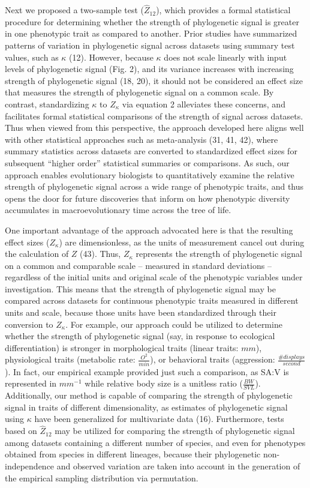 \documentclass[9pt,twocolumn,twoside,lineno]{pnas-new}
\begin{document}
Next we proposed a two-sample test (\(\hat{Z}_{12}\)), which provides a
formal statistical procedure for determining whether the strength of
phylogenetic signal is greater in one phenotypic trait as compared to
another. Prior studies have summarized patterns of variation in
phylogenetic signal across datasets using summary test values, such as
\(\kappa\) (12). However, because \(\kappa\) does not scale linearly
with input levels of phylogenetic signal (Fig. 2), and its variance
increases with increasing strength of phylogenetic signal (18, 20), it
should not be considered an effect size that measures the strength of
phylogenetic signal on a common scale. By contrast, standardizing
\(\kappa\) to \(Z_\kappa\) via equation 2 alleviates these concerns, and
facilitates formal statistical comparisons of the strength of signal
across datasets. Thus when viewed from this perspective, the approach
developed here aligns well with other statistical approaches such as
meta-analysis (31, 41, 42), where summary statistics across datasets are
converted to standardized effect sizes for subsequent ``higher order''
statistical summaries or comparisons. As such, our approach enables
evolutionary biologists to quantitatively examine the relative strength
of phylogenetic signal across a wide range of phenotypic traits, and
thus opens the door for future discoveries that inform on how phenotypic
diversity accumulates in macroevolutionary time across the tree of life.

One important advantage of the approach advocated here is that the
resulting effect sizes (\(Z_\kappa\)) are dimensionless, as the units of
measurement cancel out during the calculation of \(Z\) (43). Thus,
\(Z_\kappa\) represents the strength of phylogenetic signal on a common
and comparable scale -- measured in standard deviations -- regardless of
the initial units and original scale of the phenotypic variables under
investigation. This means that the strength of phylogenetic signal may
be compared across datasets for continuous phenotypic traits measured in
different units and scale, because those units have been standardized
through their conversion to \(Z_\kappa\). For example, our approach
could be utilized to determine whether the strength of phylogenetic
signal (say, in response to ecological differentiation) is stronger in
morphological traits (linear traits: \(mm\)), physiological traits
(metabolic rate: \(\frac{O^2}{min}\)), or behavioral traits (aggression:
\(\frac{\#{displays}}{second}\)). In fact, our empirical example
provided just such a comparison, as SA:V is represented in \(mm^{-1}\)
while relative body size is a unitless ratio (\(\frac{BW}{SVL}\)).
Additionally, our method is capable of comparing the strength of
phylogenetic signal in traits of different dimensionality, as estimates
of phylogenetic signal using \(\kappa\) have been generalized for
multivariate data (16). Furthermore, tests based on \(\hat{Z}_{12}\) may
be utilized for comparing the strength of phylogenetic signal among
datasets containing a different number of species, and even for
phenotypes obtained from species in different lineages, because their
phylogenetic non-independence and observed variation are taken into
account in the generation of the empirical sampling distribution via
permutation.
\end{document}
